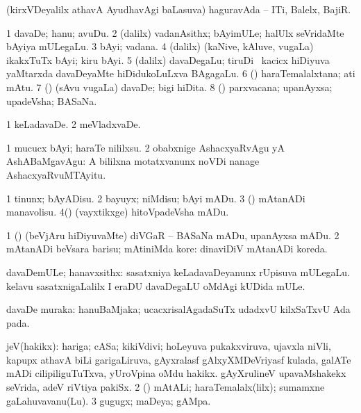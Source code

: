 \bentry
{}
\gl{\nA}
\bmng
(kirxVDeyalilx athavA AyudhavAgi baLasuva) haguravAda -- ITi, Balelx, BajiR. 
\emng
\eentry

\bentry
{}
\gl{\nA}
\bmng
\bnum
\num{1} davaDe; hanu; avuDu. 
\num{2} (\bava dalilx) vadanAsithx; bAyimULe; halUlx seVridaMte bAyiya mULegaLu. 
\num{3} bAyi; vadana. 
\num{4} (\bava dalilx) (kaNive, kAluve, \mo vugaLa) ikakxTuTx bAyi; kiru bAyi. 
\num{5} (\bava dalilx) davaDegaLu; tiruDi \mo\ kacicx hiDiyuva yaMtarxda davaDeyaMte hiDidukoLuLxva BAgagaLu. 
\num{6} (\AmA) haraTemalalxtana; ati mAtu. 
\num{7} (\rUpa) (sAvu \mo vugaLa) davaDe; bigi hiDita. 
\num{8} (\AmA) parxvacana; upanAyxsa; upadeVsha; BASaNa. 
\enum
\emng

\noindent
\gl{\pagu}
\bmng
\bnum
\num{1}  keLadavaDe. 
\num{2}  meVladxvaDe. 
\enum
\emng

\noindent
\gl{\nuga}
\bmng
\bnum
\num{1}  mucucx bAyi; haraTe nililxsu. 
\num{2}  obabxnige AshacxyaRvAgu yA AshABaMgavAgu:  A bililxna motatxvanunx noVDi nanage AshacxyaRvuMTAyitu. 
\enum
\emng
\eentry

\bentry
{}
\gl{\sakirx}
\bmng
\bnum
\num{1} tinunx; bAyADisu. 
\num{2} bayuyx; niMdisu; bAyi mADu. 
\num{3} (\ashi) mAtanADi manavolisu. 
\num{4}(\ashi) (vayxtikxge) hitoVpadeVsha mADu. 
\enum
\emng

\noindent
\gl{\akirx}
\bmng
\bnum
\num{1} (\ashi) (beVjAru hiDiyuvaMte) diVGaR -- BASaNa mADu, upanAyxsa mADu. 
\num{2} mAtanADi beVsara barisu; mAtiniMda kore:  dinaviDiV mAtanADi koreda. 
\enum
\emng
\eentry

\bentry
{}
\gl{\nA}
\bmng
davaDemULe; hanavxsithx: 
\banum
{} sasatxniya keLadavaDeyanunx rUpisuva mULegaLu. 
 kelavu sasatxnigaLalilx I eraDU davaDegaLU oMdAgi kUDida mULe. 
\eanum
\emng
\eentry

\bentry
{}
\gl{\nA}
\bmng
davaDe muraka: hanuBaMjaka; ucacxrisalAgadaSuTx udadxvU kilxSaTxvU Ada pada. 
\emng
\eentry

\bentry
{}
\gl{\nA}
\bmng
\bnum
{} 
\banum
{} jeV(hakikx): hariga; cASa; kikiVdivi; hoLeyuva pukakxviruva, ujavxla niVli, kapupx athavA biLi garigaLiruva, gAyxralasf gAlxyXMDeVriyasf kulada, galATe mADi cilipiliguTuTxva, yUroVpina oMdu hakikx. 
 gAyXrulineV upavaMshakekx seVrida, adeV riVtiya pakiSx. 
\eanum
\numie
\num{2} (\rUpa) mAtALi; haraTemalalx(lilx); sumamxne gaLahuvavanu(Lu). 
\num{3} gugugx; maDeya; gAMpa. 
\enum
\emng
\eentry

